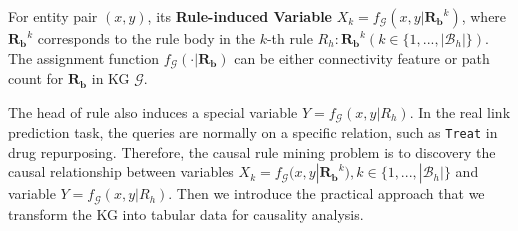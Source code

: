 \begin{definitionnew}
For entity pair $(x,y)$, its \textbf{Rule-induced Variable} $X_k=f_{\mathcal{G}}(x,y|\mathbf{R_b}^k)$, where $\mathbf{R_b}^k$ corresponds to the rule body in the $k$-th rule $R_h:\mathbf{R_b}^k (k \in \{1, ..., |\mathcal{B}_h|\})$. The assignment function $f_{\mathcal{G}}(\cdot|\mathbf{R_b})$ can be either connectivity feature or path count for $\mathbf{R_b}$ in KG $\mathcal{G}$.
\end{definitionnew}

The head of rule also induces a special variable $Y=f_{\mathcal{G}}(x,y|R_h)$.
In the real link prediction task, the queries are normally on a specific relation, such as \texttt{Treat} in drug repurposing.
Therefore, the causal rule mining problem is to discovery the causal relationship between variables $X_k=f_{\mathcal{G}}(x,y|\mathbf{R_b}^k), k \in \{1, ..., |\mathcal{B}_h|\}$ and variable  $Y=f_{\mathcal{G}}(x,y|R_h)$.
Then we introduce the practical approach that we transform the KG into tabular data for causality analysis.




